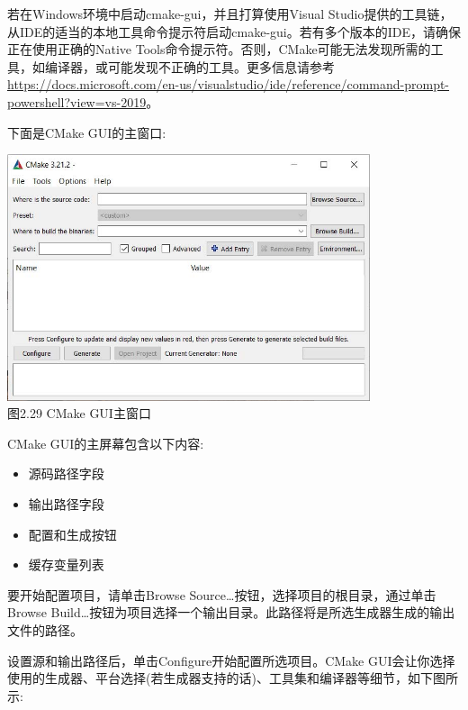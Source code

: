 \begin{tcolorbox}[colback=webgreen!5!white,colframe=webgreen!75!black,title=Note]
若在Windows环境中启动cmake-gui，并且打算使用Visual Studio提供的工具链，从IDE的适当的本地工具命令提示符启动cmake-gui。若有多个版本的IDE，请确保正在使用正确的Native Tools命令提示符。否则，CMake可能无法发现所需的工具，如编译器，或可能发现不正确的工具。更多信息请参考\url{https://docs.microsoft.com/en-us/visualstudio/ide/reference/command-prompt-powershell?view=vs-2019}。
\end{tcolorbox}

下面是CMake GUI的主窗口:

\begin{center}
\includegraphics[width=0.8\textwidth]{content/1/chapter2/images/29.jpg}\\
图2.29 CMake GUI主窗口
\end{center}

CMake GUI的主屏幕包含以下内容:

\begin{itemize}
\item 
源码路径字段

\item 
输出路径字段

\item 
配置和生成按钮

\item 
缓存变量列表
\end{itemize}

要开始配置项目，请单击Browse Source…按钮，选择项目的根目录，通过单击Browse Build…按钮为项目选择一个输出目录。此路径将是所选生成器生成的输出文件的路径。

设置源和输出路径后，单击Configure开始配置所选项目。CMake GUI会让你选择使用的生成器、平台选择(若生成器支持的话)、工具集和编译器等细节，如下图所示:

